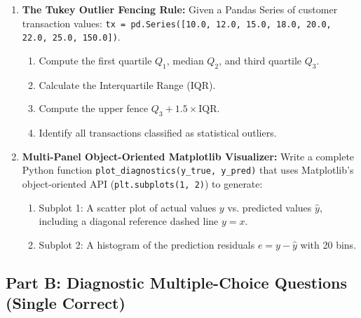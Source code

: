 \begin{enumerate}
    \item \textbf{The Tukey Outlier Fencing Rule:}
    Given a Pandas Series of customer transaction values:
    \texttt{tx = pd.Series([10.0, 12.0, 15.0, 18.0, 20.0, 22.0, 25.0, 150.0])}.
    \begin{enumerate}
        \item Compute the first quartile $Q_1$, median $Q_2$, and third quartile $Q_3$.
        \item Calculate the Interquartile Range (IQR).
        \item Compute the upper fence $Q_3 + 1.5 \times \text{IQR}$.
        \item Identify all transactions classified as statistical outliers.
    \end{enumerate}

    \item \textbf{Multi-Panel Object-Oriented Matplotlib Visualizer:}
    Write a complete Python function \texttt{plot\_diagnostics(y\_true, y\_pred)} that uses Matplotlib's object-oriented API (\texttt{plt.subplots(1, 2)}) to generate:
    \begin{enumerate}
        \item Subplot 1: A scatter plot of actual values $y$ vs. predicted values $\hat{y}$, including a diagonal reference dashed line $y = x$.
        \item Subplot 2: A histogram of the prediction residuals $e = y - \hat{y}$ with 20 bins.
    \end{enumerate}
\end{enumerate}

\subsection*{Part B: Diagnostic Multiple-Choice Questions (Single Correct)}

